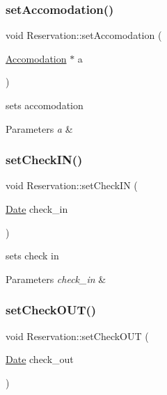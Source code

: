 \subsubsection{\texorpdfstring{set\+Accomodation()}{setAccomodation()}}
{\footnotesize\ttfamily void Reservation\+::set\+Accomodation (\begin{DoxyParamCaption}\item[{\hyperlink{class_accomodation}{Accomodation} $\ast$}]{a }\end{DoxyParamCaption})\hspace{0.3cm}{\ttfamily [inline]}}



sets accomodation 


\begin{DoxyParams}{Parameters}
{\em a} & \\
\hline
\end{DoxyParams}
\hypertarget{class_reservation_a2751145be1295ec9c031157dddb2590b}{}\label{class_reservation_a2751145be1295ec9c031157dddb2590b} 
\subsubsection{\texorpdfstring{set\+Check\+I\+N()}{setCheckIN()}}
{\footnotesize\ttfamily void Reservation\+::set\+Check\+IN (\begin{DoxyParamCaption}\item[{\hyperlink{class_date}{Date}}]{check\+\_\+in }\end{DoxyParamCaption})\hspace{0.3cm}{\ttfamily [inline]}}



sets check in 


\begin{DoxyParams}{Parameters}
{\em check\+\_\+in} & \\
\hline
\end{DoxyParams}
\hypertarget{class_reservation_a3ecb41a114fa2771f64e8a0486ab7f35}{}\label{class_reservation_a3ecb41a114fa2771f64e8a0486ab7f35} 
\subsubsection{\texorpdfstring{set\+Check\+O\+U\+T()}{setCheckOUT()}}
{\footnotesize\ttfamily void Reservation\+::set\+Check\+O\+UT (\begin{DoxyParamCaption}\item[{\hyperlink{class_date}{Date}}]{check\+\_\+out }\end{DoxyParamCaption})\hspace{0.3cm}{\ttfamily [inline]}}



